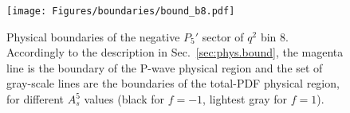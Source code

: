 \begin{figure}[!hbt]
  \centering
  \texttt{[image: Figures/boundaries/bound\_b8.pdf]}
  \caption{Physical boundaries of the negative $P_5'$ sector of $q^2$ bin 8. Accordingly to the description in Sec.~\ref{sec:phys.bound}, the magenta line is the boundary of the P-wave physical region and the set of gray-scale lines are the boundaries of the total-PDF physical region, for different $A_s^5$ values (black for $f=-1$, lightest gray for $f=1$).}
  \label{fig:bound8}
\end{figure}
